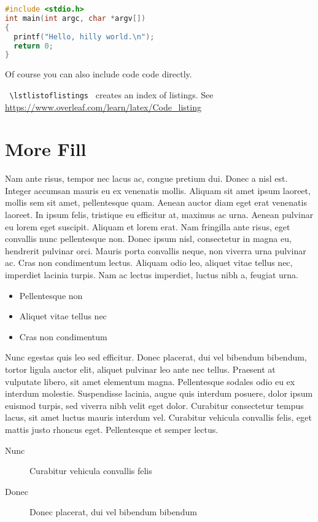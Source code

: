 \documentclass[10pt, a4paper]{article} %
\newcommand{\code}[1]{\texttt{#1}}
\begin{document}
\begin{lstlisting}[language=c, caption={Hello world in C}, label=lst:hello-world-c]
#include <stdio.h>
int main(int argc, char *argv[])
{
  printf("Hello, hilly world.\n");
  return 0;
}
\end{lstlisting}

Of course you can also include code code directly. 

\code{ \textbackslash lstlistoflistings } creates an index of listings.
See  \url{https://www.overleaf.com/learn/latex/Code\_listing}

\section{More Fill}

Nam ante risus, tempor nec lacus ac, congue pretium dui. Donec a nisl est. Integer accumsan mauris eu ex venenatis mollis. Aliquam sit amet ipsum laoreet, mollis sem sit amet, pellentesque quam. Aenean auctor diam eget erat venenatis laoreet. In ipsum felis, tristique eu efficitur at, maximus ac urna. Aenean pulvinar eu lorem eget suscipit. Aliquam et lorem erat. Nam fringilla ante risus, eget convallis nunc pellentesque non. Donec ipsum nisl, consectetur in magna eu, hendrerit pulvinar orci. Mauris porta convallis neque, non viverra urna pulvinar ac. Cras non condimentum lectus. Aliquam odio leo, aliquet vitae tellus nec, imperdiet lacinia turpis. Nam ac lectus imperdiet, luctus nibh a, feugiat urna.

\begin{itemize}
	\item Pellentesque non
	\item Aliquet vitae tellus nec
	\item  Cras non condimentum 
\end{itemize}

Nunc egestas quis leo sed efficitur. Donec placerat, dui vel bibendum bibendum, tortor ligula auctor elit, aliquet pulvinar leo ante nec tellus. Praesent at vulputate libero, sit amet elementum magna. Pellentesque sodales odio eu ex interdum molestie. Suspendisse lacinia, augue quis interdum posuere, dolor ipsum euismod turpis, sed viverra nibh velit eget dolor. Curabitur consectetur tempus lacus, sit amet luctus mauris interdum vel. Curabitur vehicula convallis felis, eget mattis justo rhoncus eget. Pellentesque et semper lectus.

\begin{description}
	\item[Nunc] Curabitur vehicula convallis felis
	\item[Donec] Donec placerat, dui vel bibendum bibendum
\end{description}
\end{document}
